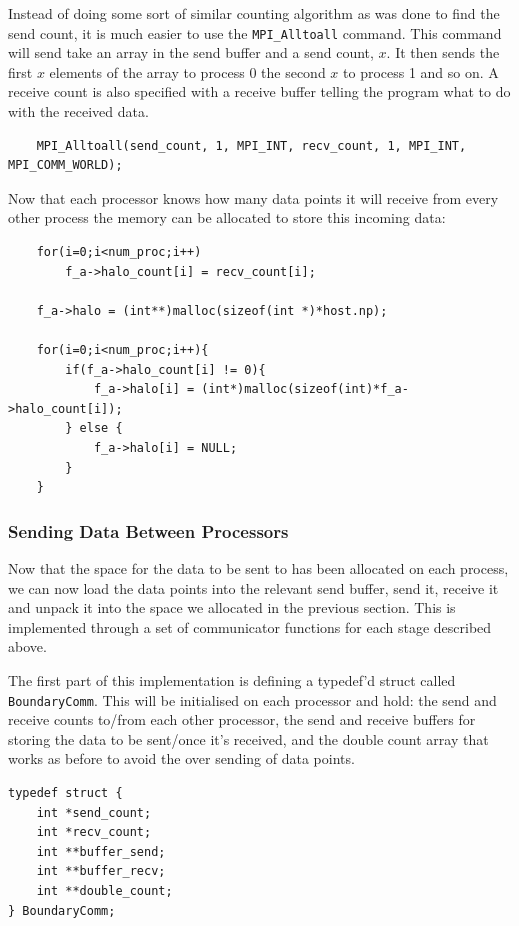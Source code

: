 \documentclass[pdftex,12pt,a4paper]{article}
\begin{document}
Instead of doing some sort of similar counting algorithm as was done to find the send count, it is much easier to use the \verb|MPI_Alltoall| command. This command will send take an array in the send buffer and a send count, $x$. It then sends the first $x$ elements of the array to process 0 the second $x$ to process 1 and so on. A receive count is also specified with a receive buffer telling the program what to do with the received data.

\begin{lstlisting}
	MPI_Alltoall(send_count, 1, MPI_INT, recv_count, 1, MPI_INT, MPI_COMM_WORLD);
\end{lstlisting}

Now that each processor knows how many data points it will receive from every other process the memory can be allocated to store this incoming data:

\begin{lstlisting}
	for(i=0;i<num_proc;i++)
		f_a->halo_count[i] = recv_count[i];

	f_a->halo = (int**)malloc(sizeof(int *)*host.np);

	for(i=0;i<num_proc;i++){
		if(f_a->halo_count[i] != 0){
			f_a->halo[i] = (int*)malloc(sizeof(int)*f_a->halo_count[i]);
		} else {
			f_a->halo[i] = NULL;
		}
	}
\end{lstlisting}



\subsubsection{Sending Data Between Processors}

Now that the space for the data to be sent to has been allocated on each process, we can now load the data points into the relevant send buffer, send it, receive it and unpack it into the space we allocated in the previous section. This is implemented through a set of communicator functions for each stage described above.

The first part of this implementation is defining a typedef'd struct called \verb|BoundaryComm|. This will be initialised on each processor and hold:  the send and receive counts to/from each other processor, the send and receive buffers for storing the data to be sent/once it's received, and the double count array that works as before to avoid the over sending of data points. 

\begin{lstlisting}
typedef struct {
	int *send_count;
	int *recv_count;
	int **buffer_send;
	int **buffer_recv;
	int **double_count;
} BoundaryComm; 
\end{lstlisting}
\end{document}
